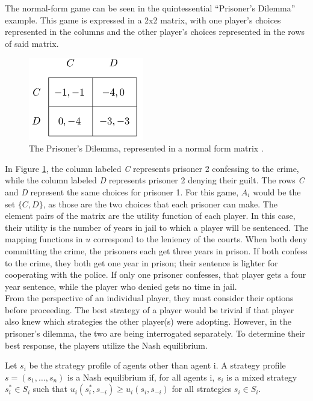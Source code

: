 The normal-form game can be seen in the quintessential ``Prisoner's Dilemma'' example. This game is expressed in a 2x2 matrix, with one player's choices represented in the columns and the other player's choices represented in the rows of said matrix.

\begin{figure}[h]
  \centering
  \includegraphics[width=5cm]{figures/ExampleGrid.png}
  \caption{The Prisoner's Dilemma, represented in a normal form matrix \cite{shoh09}.}
  \label{fig:prisoner}
\end{figure}

In Figure \ref{fig:prisoner}, the column labeled \textit{C} represents prisoner 2 confessing to the crime, while the column labeled \textit{D} represents prisoner 2 denying their guilt. The rows \textit{C} and \textit{D} represent the same choices for prisoner 1. For this game, $A_i$ would be the set $\{C, D\}$, as those are the two choices that each prisoner can make. The element pairs of the matrix are the utility function of each player. In this case, their utility is the number of years in jail to which a player will be sentenced. The mapping functions in $u$ correspond to the leniency of the courts. When both deny committing the crime, the prisoners each get three years in prison. If both confess to the crime, they both get one year in prison; their sentence is lighter for cooperating with the police. If only one prisoner confesses, that player gets a four year sentence, while the player who denied gets no time in jail.\\

From the perspective of an individual player, they must consider their options before proceeding. The best strategy of a player would be trivial if that player also knew which strategies the other player(s) were adopting. However, in the prisoner's dilemma, the two are being interrogated separately. To determine their best response, the players utilize the Nash equilibrium.

\begin{define}
  Let $s_i$ be the strategy profile of agents other than agent i. A strategy profile $s=(s_1,\dots ,s_n)$ is a Nash equilibrium if, for all agents i, $s_i$ is a mixed strategy $s^*_i\in S_i$ such that $u_i(s^*_i, s_{-i}) \ge u_i(s_i, s_{-i})$ for all strategies $s_i\in S_i$.
\end{define}

